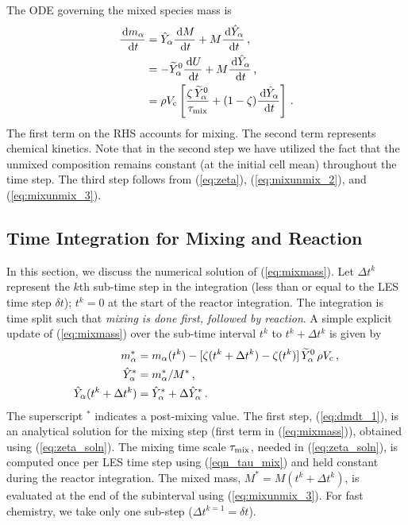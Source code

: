 The ODE governing the mixed species mass is
\begin{align}
\label{eq:mixmass}
\frac{\,\mathrm{d} m_{\alpha}}{\,\mathrm{d} t} &= \hat{Y}_\alpha \frac{\,\mathrm{d} M}{\,\mathrm{d} t} + M \frac{\,\mathrm{d} \hat{Y}_\alpha}{\,\mathrm{d} t} \,\mbox{,} \notag\\
&= - \widetilde{Y}_{\alpha}^0 \frac{\,\mathrm{d} U}{\,\mathrm{d} t} + M \frac{\,\mathrm{d} \hat{Y}_\alpha}{\,\mathrm{d} t} \,\mbox{,} \notag\\
&= \rho V_{\rm c} \left[ \frac{\zeta \, \widetilde{Y}_{\alpha}^0 }{\tau_{\rm mix}} + (1-\zeta) \frac{\,\mathrm{d} \hat{Y}_\alpha}{\,\mathrm{d} t} \right]\,\mbox{.} 
\end{align}
The first term  on the RHS accounts for mixing.  The second term represents chemical kinetics. Note that in the second step we have utilized the fact that the unmixed composition remains constant (at the initial cell mean) throughout the time step. The third step follows from (\ref{eq:zeta}), (\ref{eq:mixunmix_2}), and (\ref{eq:mixunmix_3}).

\subsection{Time Integration for Mixing and Reaction}
\label{sec:reac_time_integration} 

In this section, we discuss the numerical solution of (\ref{eq:mixmass}). Let $\Delta t^k$ represent the $k$th sub-time step in the integration (less than or equal to the LES time step $\delta t$); $t^k=0$ at the start of the reactor integration.  The integration is time split such that \emph{mixing is done first, followed by reaction}. A simple explicit update of (\ref{eq:mixmass}) over the sub-time interval $t^k$ to $t^k + \Delta t^k$ is given by
\begin{align}
\label{eq:dmdt_1} m_\alpha^* &= m_{\alpha}(t^k) - [ \zeta(t^k+\Delta t^k) - \zeta(t^k) ] \, \widetilde{Y}_{\alpha}^0 \, \rho V_{\rm c} \,\mbox{,} \\
\label{eq:ystar}  \hat{Y}_\alpha^* &= m_\alpha^*/M^* \,\mbox{,} \\
\label{eq:dmdt_2} \hat{Y}_\alpha(t^k + \Delta t^k) &= \hat{Y}_\alpha^* + \Delta \hat{Y}_\alpha^* \,\mbox{.}
\end{align}
The superscript $^*$ indicates a post-mixing value.  The first step, (\ref{eq:dmdt_1}), is an analytical solution for the mixing step (first term in (\ref{eq:mixmass})), obtained using (\ref{eq:zeta_soln}).  The mixing time scale $\tau_{\rm mix}$, needed in (\ref{eq:zeta_soln}), is computed once per LES time step using (\ref{eqn_tau_mix}) and held constant during the reactor integration. The mixed mass, $M^* = M(t^k + \Delta t^k)$, is evaluated at the end of the subinterval using (\ref{eq:mixunmix_3}). For fast chemistry, we take only one sub-step ($\Delta t^{k=1} = \delta t$).

